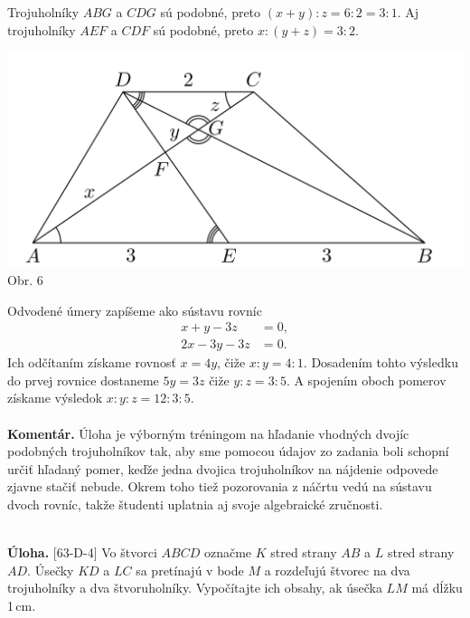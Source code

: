 \documentclass[11pt,a4paper,oneside,final]{book}
\newcommand{\kom}{\textbf{Komentár.} }
\newcommand{\ul}{\textbf{Úloha.} }
\begin{document}
Trojuholníky $ABG$ a $CDG$ sú podobné, preto $(x + y) : z = 6 : 2 = 3 : 1$. Aj trojuholníky $AEF$ a $CDF$ sú podobné, preto $x : (y + z) = 3 : 2$.
\begin{center}
\includegraphics[scale=0.3]{64D4}\\
Obr. 6
\end{center}
Odvodené úmery zapíšeme ako sústavu rovníc
\begin{align*}
x + y - 3z &= 0,\\
2x - 3y - 3z &= 0.
\end{align*}
Ich odčítaním získame rovnosť $x = 4y$, čiže $x : y = 4 : 1$. Dosadením tohto výsledku do prvej rovnice dostaneme $5y = 3z$ čiže $y : z = 3 : 5$. A spojením oboch pomerov získame výsledok $x : y : z = 12 : 3 : 5$.\\
\\
\kom Úloha je výborným tréningom na hľadanie vhodných dvojíc podobných trojuholníkov tak, aby sme pomocou údajov zo zadania boli schopní určiť hľadaný pomer, keďže jedna dvojica trojuholníkov na nájdenie odpovede zjavne stačiť nebude. Okrem toho tiež pozorovania z náčrtu vedú na sústavu dvoch rovníc, takže študenti uplatnia aj svoje algebraické zručnosti.\\
\\
\begin{tcolorbox}[breakable,notitle,boxrule=0pt,colback=light-gray,colframe=light-gray]\ul [63-D-4] Vo štvorci $ABCD$ označme $K$ stred strany $AB$ a $L$ stred strany $AD$. Úsečky $KD$ a $LC$ sa pretínajú v bode $M$ a rozdeľujú štvorec na dva trojuholníky a dva štvoruholníky. Vypočítajte ich obsahy, ak úsečka $LM$ má dĺžku 1\,cm.

\end{tcolorbox}
\end{document}
